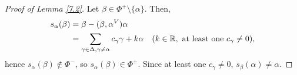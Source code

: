 \begin{proof}[Proof of Lemma \ref{7.2}]
Let $\beta \in \Phi^+ \setminus \{\alpha\}$. Then,
\begin{align*}
    s_\alpha(\beta) &= \beta - (\beta, \alpha^V) \alpha \\
    &= \sum_{\gamma \in \Delta, \gamma \neq \alpha}
        c_{\gamma} \gamma + k\alpha    \quad (k \in \mathbb{R}, \textrm{ at least one } c_\gamma \neq 0),
\end{align*}
hence $s_\alpha(\beta) \not\in \Phi^-$, so $s_\alpha(\beta) \in \Phi^+$. Since
at least one $c_\gamma \neq 0$, $s_\beta(\alpha) \neq \alpha$.
\end{proof}
